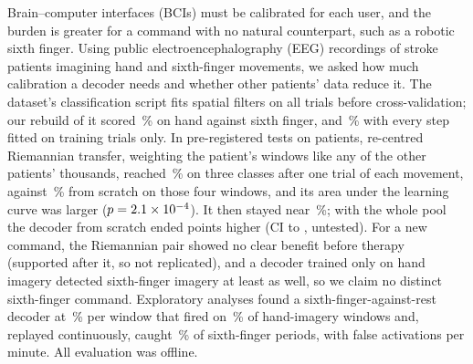 Brain--computer interfaces (BCIs) must be calibrated for each user, and the
burden is greater for a command with no natural counterpart, such as a
robotic sixth finger. Using public electroencephalography (EEG) recordings of
\nSubjects{} stroke patients imagining hand and sixth-finger movements, we
asked how much calibration a decoder needs and whether other patients' data
reduce it. The dataset's classification script fits spatial filters on all
trials before cross-validation; our rebuild of it scored
\rqOneCspLdaReplicaPaperReplicaMean\,\% on hand against sixth finger, and
\rqOneCspLdaReplicaCvLeakfreeMean\,\% with every step fitted on training trials
only. In pre-registered tests on \rqTwoHTwoAN{} patients, re-centred
Riemannian transfer, weighting the patient's windows like any of the other
patients' thousands, reached \rqTwoRestAhSfRctTslrKOneMean\,\% on
three classes after one trial of each movement, against
\rqTwoRestAhSfTsLrKOneMean\,\% from scratch on those four windows, and its area under the learning curve was larger
($p = 2.1\times10^{-4}$). It then stayed near \rqTwoRestAhSfRctTslrKAllMean\,\%;
with the whole pool the decoder from scratch ended
\rqTwoRestAhSfTsLrMinusRctTslrKAllDiff{} points higher (CI
\rqTwoRestAhSfTsLrMinusRctTslrKAllDiffCiLo{} to
\rqTwoRestAhSfTsLrMinusRctTslrKAllDiffCiHi, untested). For a new command, the
Riemannian pair showed no clear benefit before therapy (supported after it,
so not replicated), and a decoder trained only on hand imagery detected
sixth-finger imagery at least as well, so we claim no distinct sixth-finger
command. Exploratory analyses found a sixth-finger-against-rest decoder at
\exFourTsLrCentralMean\,\% per window that fired on
\exFourTsLrCentralFiresAhMean\,\% of hand-imagery windows and,
replayed continuously, caught \exFiveFingerFingerOnMean\,\% of sixth-finger periods,
with \exFiveFingerFalsePerMinMean{} false activations per minute. All
evaluation was offline.
